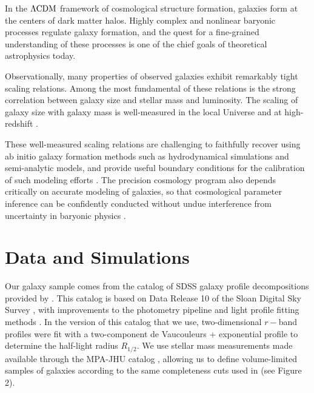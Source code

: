 \documentclass[usenatbib,usegraphicx,letterpaper]{mn2e}
\newcommand{\rhalf}{R_{1/2}}
\newcommand{\lcdm}{\Lambda{\rm CDM}}
\begin{document}
In the $\lcdm$ framework of cosmological structure formation, galaxies form at the centers of dark matter halos. Highly complex and nonlinear baryonic processes regulate galaxy formation, and the quest for a fine-grained understanding of these processes is one of the chief goals of theoretical astrophysics today.

Observationally, many properties of observed galaxies exhibit remarkably tight scaling relations. Among the most fundamental of these relations is the strong correlation between galaxy size and stellar mass and luminosity. The scaling of galaxy size with galaxy mass is well-measured in the local Universe \citep{shen_etal03,guo_etal09,huang_etal13,zhang_yang17} and at high-redshift \citep{trujillo_etal04,vanderwel_etal14,kawamata_etal15,shibuya_etal15,huertas_company_etal13a,lange_etal15,huang_etal17}.

These well-measured scaling relations are challenging to faithfully recover using ab initio galaxy formation methods such as hydrodynamical simulations and semi-analytic models, and provide useful boundary conditions for the calibration of such modeling efforts \citep{khochfar_silk06,dutton_etal10,hopkins_etal10a,bottrell_etal17b}. The precision cosmology program also depends critically on accurate modeling of galaxies, so that cosmological parameter inference can be confidently conducted without undue interference from uncertainty in baryonic physics \citep{LSST_science,LSST_galaxies}.



\section{Data and Simulations}
\label{sec:data}

Our galaxy sample comes from the catalog of SDSS galaxy profile decompositions provided by \citet{meert_etal15}. This catalog is based on Data Release 10 of the Sloan Digital Sky Survey \citep[SDSS,][]{ahn_etal14}, with improvements to the photometry pipeline and light profile fitting methods \citep{vikram_etal10,bernardi_etal13,bernardi_etal14,meert_etal13}. In the version of this catalog that we use, two-dimensional $r-$band profiles were fit with a two-component de Vaucouleurs + exponential profile to determine the half-light radius $\rhalf.$ We use stellar mass measurements made available through the MPA-JHU catalog \citep{kauffmann_etal03,brinchmann_etal04}, allowing us to define volume-limited samples of galaxies according to the same completeness cuts used in \citet{behroozi_etal15} (see Figure 2).
\end{document}
